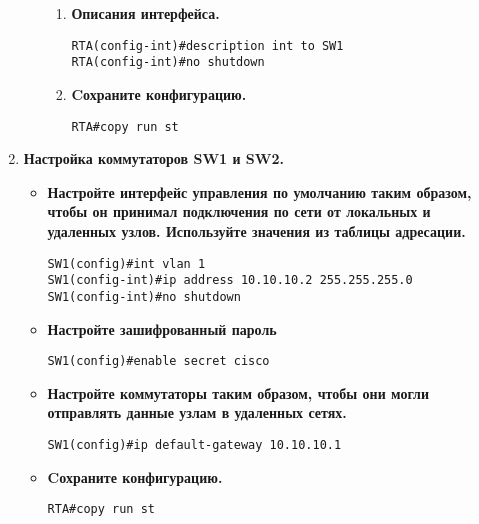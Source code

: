 \documentclass[a4paper,14pt]{extarticle}
\begin{document}
\begin{enumerate}
\begin{itemize}
\begin{enumerate}
                            \item \textbf{Описания интерфейса.}
                                \begin{lstlisting}
RTA(config-int)#description int to SW1
RTA(config-int)#no shutdown
                                \end{lstlisting}
                            \item \textbf{Cохраните конфигурацию.}
                                \begin{lstlisting}
RTA#copy run st
                                \end{lstlisting}
                        \end{enumerate}
        \end{itemize}
        \item \textbf{Настройка коммутаторов SW1 и SW2.}
        \begin{itemize}
                \item \textbf{Настройте интерфейс управления по умолчанию таким образом, чтобы он принимал подключения по сети от локальных и удаленных узлов. Используйте значения из таблицы адресации.}
                \begin{lstlisting}
SW1(config)#int vlan 1
SW1(config-int)#ip address 10.10.10.2 255.255.255.0
SW1(config-int)#no shutdown
                \end{lstlisting}
                \item \textbf{Настройте зашифрованный пароль}
                \begin{lstlisting}
SW1(config)#enable secret cisco
                \end{lstlisting}
                \item \textbf{Настройте коммутаторы таким образом, чтобы они могли отправлять данные узлам в удаленных сетях.}
                \begin{lstlisting}
SW1(config)#ip default-gateway 10.10.10.1
                \end{lstlisting}
                \item \textbf{Cохраните конфигурацию.}
                    \begin{lstlisting}
RTA#copy run st
                    \end{lstlisting}
        \end{itemize}
    \end{enumerate}
    
\end{document}
